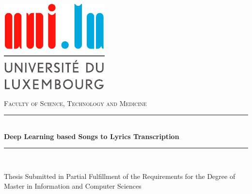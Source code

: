 \newcommand{\HRule}{\rule{\linewidth}{0.5mm}}

\begin{titlepage}

\begin{center}

\includegraphics{00-frontmatter/unilogo.pdf}

\vspace{1cm}

\textsc{\Large Faculty of Science, Technology and Medicine}\\[1.0cm]

\vspace{1cm}

\HRule \\[0.4cm]
{\huge \bfseries Deep Learning based Songs to Lyrics Transcription}\\
\HRule \\[1.5cm]


\begin{minipage}{0.8\textwidth}
\begin{center}
{\Large Thesis Submitted in Partial Fulfillment of the Requirements
for the Degree of Master in Information and Computer Sciences}
\end{center}
\end{minipage}


\end{center}
\end{titlepage}
